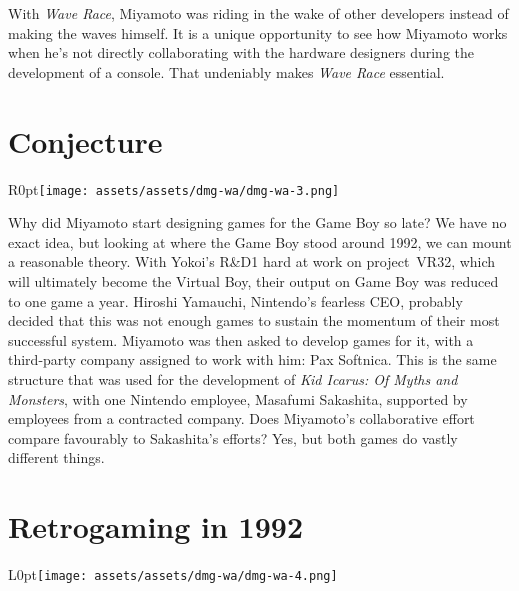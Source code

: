 \documentclass{book}
\begin{document}
With \emph{Wave Race}, Miyamoto was riding in the wake of other developers instead of making the waves himself. It is a unique opportunity to see how Miyamoto works when he’s not directly collaborating with the hardware designers during the development of a console. That undeniably makes \emph{Wave Race} essential.\par
\FloatBarrier\section*{Conjecture}
\begin{wrapfigure}{R}{0pt}{\texttt{[image: assets/assets/dmg-wa/dmg-wa-3.png]}}\end{wrapfigure}
Why did Miyamoto start designing games for the Game Boy so late? We have no exact idea, but looking at where the Game Boy stood around 1992, we can mount a reasonable theory. With Yokoi’s R\&D1 hard at work on project~VR32, which will ultimately become the Virtual Boy, their output on Game Boy was reduced to one game a year. Hiroshi Yamauchi, Nintendo’s fearless CEO, probably decided that this was not enough games to sustain the momentum of their most successful system. Miyamoto was then asked to develop games for it, with a third-party company assigned to work with him: Pax Softnica. This is the same structure that was used for the development of \emph{Kid Icarus: Of Myths and Monsters}, with one Nintendo employee, Masafumi Sakashita, supported by employees from a contracted company. Does Miyamoto’s collaborative effort compare favourably to Sakashita’s efforts? Yes, but both games do vastly different things.\par
\FloatBarrier\section*{Retrogaming in 1992}
\begin{wrapfigure}{L}{0pt}{\texttt{[image: assets/assets/dmg-wa/dmg-wa-4.png]}}\end{wrapfigure}\noindent
\end{document}
